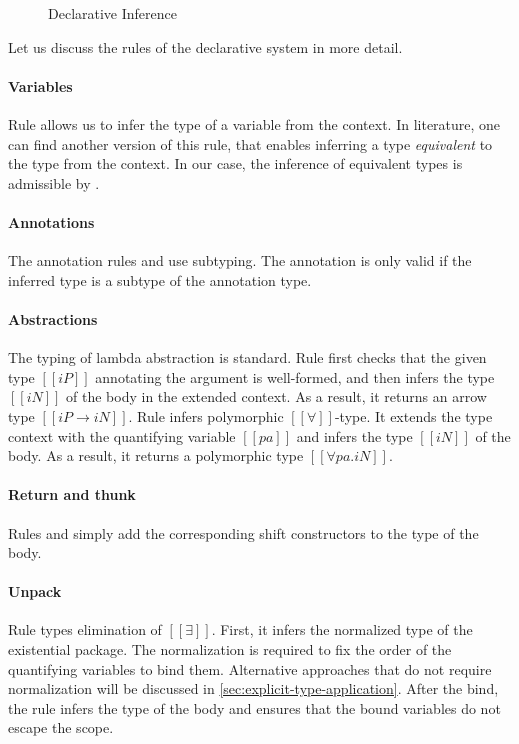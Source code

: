 \begin{figure}[t!]
  \ottdefnsDTLabeled
  \caption{Declarative Inference}
  \label{fig:declarative-inference}
\end{figure}

Let us discuss the rules of the declarative system in more detail.

\paragraph*{Variables}
    Rule  allows us to infer
    the type of a variable from the context. 
    In literature, one can find another version of this rule,
    that enables inferring a type \emph{equivalent}
    to the type from the context. 
    In our case, the inference of equivalent types is admissible by .


\paragraph*{Annotations}
  The annotation rules 
  and  use subtyping.
  The annotation is only valid if the
  inferred type is a subtype of the annotation type.

\paragraph*{Abstractions}
  The typing of lambda abstraction is standard. 
  Rule  first checks
  that the given type $[[iP]]$ annotating the argument is well-formed,
  and then infers the type $[[iN]]$ of the body in the extended context.
  As a result, it returns an arrow type $[[iP → iN]]$.
  Rule  infers polymorphic $[[∀]]$-type. 
  It extends the type context with the quantifying variable $[[pa]]$ and 
  infers the type $[[iN]]$ of the body. As a result, it returns a polymorphic type
  $[[∀pa.iN]]$.

\paragraph*{Return and thunk}
  Rules  
  and 
  simply add the corresponding shift constructors to the type of the body.

\paragraph*{Unpack}
  Rule  types elimination of $[[∃]]$.
  First, it infers the normalized type of the existential package.
  The normalization is required to fix the order of the quantifying variables
  to bind them. Alternative approaches that do not require normalization
  will be discussed in \cref{sec:explicit-type-application}.
  After the bind, the rule infers the type of the body 
  and ensures that the bound variables do not escape the scope.

